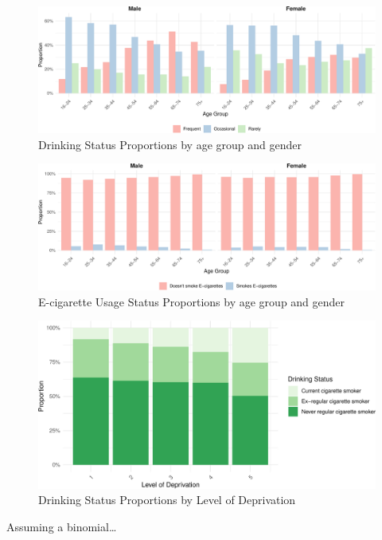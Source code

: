\documentclass[
  11pt,
]{article}
\begin{document}
\begin{figure}
\centering
\includegraphics{Coursework_files/figure-latex/output drinking by age plot-1.pdf}
\caption{Drinking Status Proportions by age group and gender}
\end{figure}

\begin{figure}
\centering
\includegraphics{Coursework_files/figure-latex/output e-cigs by age plot-1.pdf}
\caption{E-cigarette Usage Status Proportions by age group and gender}
\end{figure}

\begin{figure}
\centering
\includegraphics{Coursework_files/figure-latex/output deprivation plot-1.pdf}
\caption{Drinking Status Proportions by Level of Deprivation}
\end{figure}

Assuming a binomial\ldots{}
\end{document}
